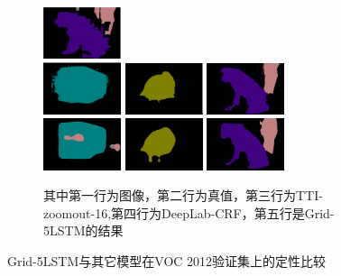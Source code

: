 {\begin{figure}
\begin{subfigure}{0.4\textwidth}
		\includegraphics[width=0.25\textwidth]{image/result/compare/zoom_dog.png} \\
		\includegraphics[width=0.25\textwidth]{image/result/compare/deeplab_bus.png}
		\includegraphics[width=0.25\textwidth]{image/result/compare/deeplab_bird.png}
		\includegraphics[width=0.25\textwidth]{image/result/compare/deeplab_dog.png} \\
		\includegraphics[width=0.25\textwidth]{image/result/compare/my_bus.png}
		\includegraphics[width=0.25\textwidth]{image/result/compare/my_bird.png}
		\includegraphics[width=0.25\textwidth]{image/result/compare/my_dog.png} 
		\caption{\tiny 其中第一行为图像，第二行为真值，第三行为TTI-zoomout-16,第四行为DeepLab-CRF，第五行是Grid-5LSTM的结果}
		\label{fig:compare2}
	\end{subfigure}
	\caption{Grid-5LSTM与其它模型在VOC 2012验证集上的定性比较}
	\end{figure}
}

